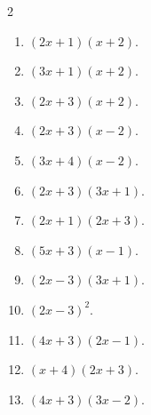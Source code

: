 \documentclass[11pt]{article}
\begin{document}
\begin{keybox}
\begin{multicols}{2}
\small
\begin{enumerate}[leftmargin=*,itemsep=3pt]
  \item $(2x+1)(x+2)$.
  \item $(3x+1)(x+2)$.
  \item $(2x+3)(x+2)$.
  \item $(2x+3)(x-2)$.
  \item $(3x+4)(x-2)$.
  \item $(2x+3)(3x+1)$.
  \item $(2x+1)(2x+3)$.
  \item $(5x+3)(x-1)$.
  \item $(2x-3)(3x+1)$.
  \item $(2x-3)^2$.
  \item $(4x+3)(2x-1)$.
  \item $(x+4)(2x+3)$.
  \item $(4x+3)(3x-2)$.
\end{enumerate}
\end{multicols}
\end{keybox}
\end{document}

